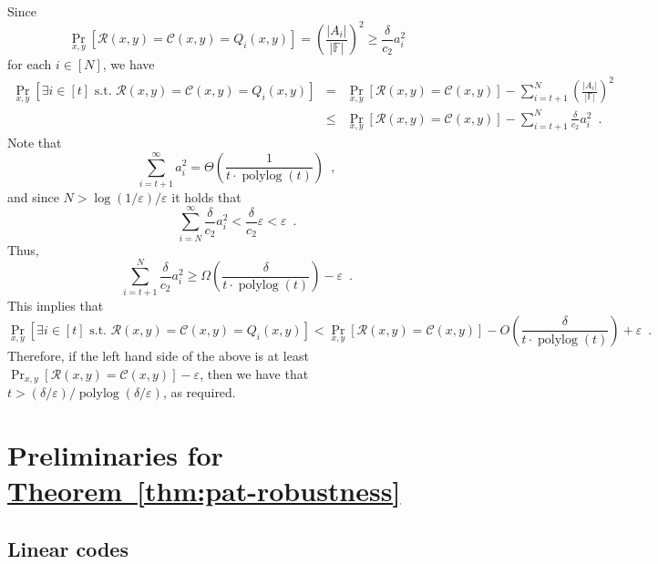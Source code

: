 \documentclass[11pt]{article}
\numberwithin{equation}{section}
\theoremstyle{definition}
\theoremstyle{plain}
\newcommand{\expref}[2]{\hyperref[#2]{#1~\ref{#2}}}
\theoremstyle{plain}
\newcommand{\colored}{}
\newcommand{\Field}{\colored{\mathbb F}}
\newcommand{\st}{\colored{\text{ s.t. }}}
\newcommand{\rowpoly}{\colored{\mathcal R}}
\newcommand{\colpoly}{\colored{\mathcal C}}
\newcommand{\prox}{\colored{\delta}}
\newcommand{\polylog}{\operatorname{polylog}}
\newcommand{\eps}{\varepsilon}
\newcommand\abs[1]{\colored{\left|#1\right|}}
\begin{document}
   Since
   \[
     \Pr_{x,y}[\rowpoly(x,y) = \colpoly(x,y) = Q_i(x,y)] = \left(\frac{\abs{A_i}}{\abs{\Field}}\right)^2 \geq \frac{\prox}{c_2} a_i^2
     \]
    for each $i \in [N]$, we have
    \begin{eqnarray*}
        \Pr_{x,y}[\exists i \in [t] \st \rowpoly(x,y) = \colpoly(x,y) = Q_i(x,y)]
        &=& \Pr_{x,y}[\rowpoly(x,y) = \colpoly(x,y)] - \sum_{i=t+1}^N \left(\frac{\abs{A_i}}{\abs{\Field}}\right)^2 \\
        &\leq& \Pr_{x,y}[\rowpoly(x,y) = \colpoly(x,y)] - \sum_{i=t+1}^N \frac{\prox}{c_2} a_i^2
        \enspace.
    \end{eqnarray*}
    Note that
    \[
      \sum_{i=t+1}^\infty a_i^2 = \Theta \left( \frac{1}{t \cdot \polylog(t)} \right)\enspace,
    \]
    and since $N > {\log(1/\eps)}/{\eps}$
    it holds that
    \[
      \sum_{i=N}^{\infty} \frac{\prox}{c_2} a_i^2 < \frac{\prox}{c_2}\eps < \eps\enspace.
    \]
    Thus,
    \[
      \sum_{i=t+1}^N \frac{\prox}{c_2} a_i^2 \geq \Omega \left( \frac{\prox}{t \cdot \polylog(t)} \right) - \eps\enspace.
    \]
    This implies that
    \begin{equation*}
        \Pr_{x,y}[\exists i \in [t] \st \rowpoly(x,y) = \colpoly(x,y) = Q_i(x,y)] < \Pr_{x,y}[\rowpoly(x,y) = \colpoly(x,y)] - O\left(\frac{\prox}{t \cdot \polylog(t)}\right)+ \eps
        \enspace.
    \end{equation*}
    Therefore, if the left hand side of the above is at least $\Pr_{x,y}[\rowpoly(x,y) = \colpoly(x,y)] - \eps $, then we have that $t  > {(\prox/\eps)}/{\polylog(\prox/\eps)}$,
    as required.

%
%
%
\section{Preliminaries for \expref{Theorem}{thm:pat-robustness}}
\label{sec:prelim-pat}

%
%
\subsection{Linear codes}
\label{sec:linear-codes}
\end{document}
